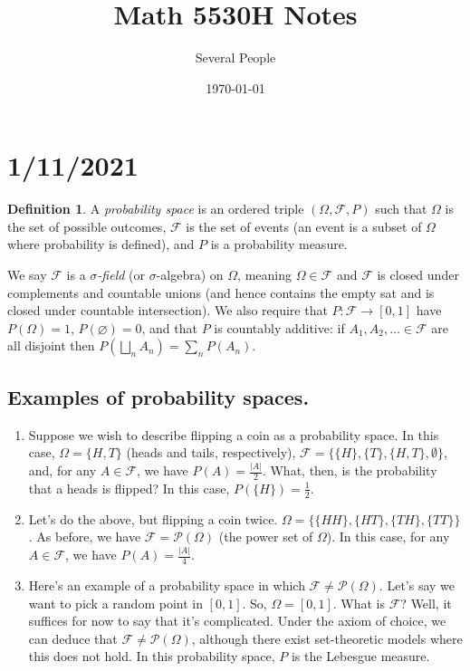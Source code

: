 \documentclass{article}
\title{\textbf{Math 5530H Notes}}
\author{Several People}
\date{\today}
\newcommand{\p}[1]{\left(#1\right)} %
\newcommand{\pow}[1]{\mathcal{P}(#1)} %
\theoremstyle{definition}
\newtheorem*{definition}{Definition}
\begin{document}
\maketitle

\section*{1/11/2021}

\begin{definition}
A \emph{probability space} is an ordered triple $\p{\Omega, \mathscr{F}, P}$ such that $\Omega$ is the set of possible outcomes, $\mathscr{F}$ is the set of events (an event is a subset of $\Omega$ where probability is defined), and $P$ is a probability measure.

We say $\mathscr{F}$ is a \emph{$\sigma$-field} (or $\sigma$-algebra) on $\Omega$, meaning $\Omega \in \mathscr{F}$ and $\mathscr{F}$ is closed under complements and countable unions (and hence contains the empty sat and is closed under countable intersection). We also require that $P: \mathscr{F} \longrightarrow [0,1]$ have $P(\Omega) = 1$, $P(\varnothing) = 0$, and that $P$ is countably additive:
if $A_1, A_2, \ldots \in \mathscr{F}$ are all disjoint then $P\left(\bigsqcup_{n} A_n \right) = \sum_n P(A_n)$.
\end{definition}

\subsection*{Examples of probability spaces.}


\begin{enumerate}[label=(\alph*)]
    \item Suppose we wish to describe flipping a coin as a probability space. In this case, $\Omega = \{H, T\}$ (heads and tails, respectively), $\mathscr{F} = \{\{H\},\{T\},\{H, T\}, \emptyset\}$, and, for any $A \in \mathscr{F}$, we have $P(A) = \frac{|A|}{2}$. What, then, is the probability that a heads is flipped? In this case, $P(\{H\}) = \frac{1}{2}$.
    \item Let's do the above, but flipping a coin twice. $\Omega = \{\{HH\},\{HT\},\{TH\},\{TT\}\}$. As before, we have $\mathscr{F} = \pow{\Omega}$ (the power set of $\Omega$). In this case, for any $A \in \mathscr{F}$, we have $P(A) = \frac{|A|}{4}$.
    \item Here's an example of a probability space in which $\mathscr{F}\neq\pow{\Omega}$. Let's say we want to pick a random point in $[0,1]$. So, $\Omega = [0,1]$. What is $\mathscr{F}$? Well, it suffices for now to say that it's complicated. Under the axiom of choice, we can deduce that $\mathscr{F}\neq\pow{\Omega}$, although there exist set-theoretic models where this does not hold. In this probability space, $P$ is the Lebesgue measure. 
\end{enumerate}
\end{document}
